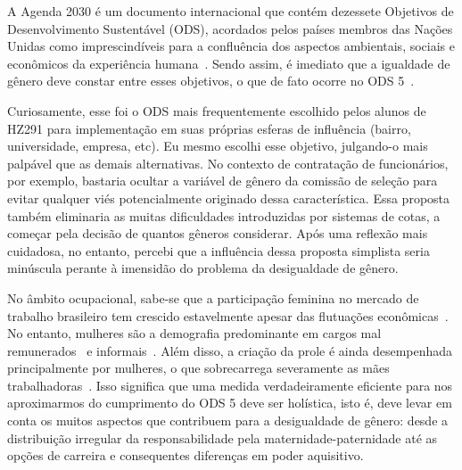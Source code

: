 \documentclass[
    article,
    11pt,
    oneside,
    a4paper,
    english,
    brazil,
    sumario=tradicional
    ]{abntex2}
\begin{document}

\frenchspacing

\maketitle

\textual

A Agenda 2030 é um documento internacional que contém dezessete Objetivos de Desenvolvimento Sustentável (ODS), acordados pelos países membros das Nações Unidas como imprescindíveis para a confluência dos aspectos ambientais, sociais e econômicos da experiência humana~\cite{unitednations}. Sendo assim, é imediato que a igualdade de gênero deve constar entre esses objetivos, o que de fato ocorre no ODS 5~\cite{ods5}.

Curiosamente, esse foi o ODS mais frequentemente escolhido pelos alunos de HZ291 para implementação em suas próprias esferas de influência (bairro, universidade, empresa, etc). Eu mesmo escolhi esse objetivo, julgando-o mais palpável que as demais alternativas. No contexto de contratação de funcionários, por exemplo, bastaria ocultar a variável de gênero da comissão de seleção para evitar qualquer viés potencialmente originado dessa característica. Essa proposta também eliminaria as muitas dificuldades introduzidas por sistemas de cotas, a começar pela decisão de quantos gêneros considerar. Após uma reflexão mais cuidadosa, no entanto, percebi que a influência dessa proposta simplista seria minúscula perante à imensidão do problema da desigualdade de gênero.

No âmbito ocupacional, sabe-se que a participação feminina no mercado de trabalho brasileiro tem crescido estavelmente apesar das flutuações econômicas~\cite{Lavinas2001}. No entanto, mulheres são a demografia predominante em cargos mal remunerados~\cite{Barros1997, Araujo2001} e informais~\cite{Cristina2007}. Além disso, a criação da prole é ainda desempenhada principalmente por mulheres, o que sobrecarrega severamente as mães trabalhadoras~\cite{Cristina2007}. Isso significa que uma medida verdadeiramente eficiente para nos aproximarmos do cumprimento do ODS 5 deve ser holística, isto é, deve levar em conta os muitos aspectos que contribuem para a desigualdade de gênero: desde a distribuição irregular da responsabilidade pela maternidade-paternidade até as opções de carreira e consequentes diferenças em poder aquisitivo.

\pagebreak

\postextual


\end{document}
